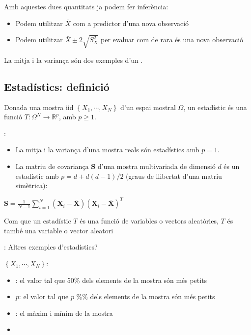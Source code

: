 \documentclass[letterpaper,10pt,english]{sphinxmanual}
\begin{document}
Amb aquestes dues quantitats ja podem fer inferència:
\begin{itemize}
\item {} 
Podem utilitzar \(\bar{X}\) com a predictor d’una nova observació

\item {} 
Podem utilitzar \(\bar{X} \pm 2 \sqrt{S^2_X}\) per evaluar com de rara és una nova observació

\end{itemize}

La mitja i la variança són dos exemples d’un .


\subsection{Estadístics: definició}
\label{\detokenize{0_Intro/0_2_Intro_stats:estadistics-definicio}}
 Donada una mostra iid \(\left\{X_1, \cdots, X_N\right\}\) d’un espai mostral \(\Omega\),
un estadístic és una funció \(T: \Omega^N \rightarrow \mathbb{R}^p\), amb \(p \geq 1\).

:
\begin{itemize}
\item {} 
La mitja i la variança d’una mostra reals són estadístics amb \(p=1\).

\item {} 
La matriu de covariança \(\mathbf{S}\) d’una mostra multivariada de dimensió \(d\) és un estadístic amb \(p=d + d(d-1)/2\) (graus de llibertat d’una matriu simètrica):

\end{itemize}

\(\mathbf{S} = \frac{1}{N-1} \sum_{i=1}^N (\mathbf{X}_i - \bar{\mathbf{X}})(\mathbf{X}_i - \bar{\mathbf{X}})^T\)

Com que un estadístic \(T\) és una funció de variables o vectors aleatòries,
\(T\) és també una variable o vector aleatori

: Altres exemples d’estadístics?

 \(\left\{X_1, \cdots, X_N\right\}\):
\begin{itemize}
\item {} 
: el valor tal que 50\% dels elements de la mostra són més petits

\item {} 
 \(p\): el valor tal que \(p\) \%\% dels elements de la mostra són més petits

\item {} 
: el màxim i mínim de la mostra

\item {} 

\end{itemize}
\end{document}
